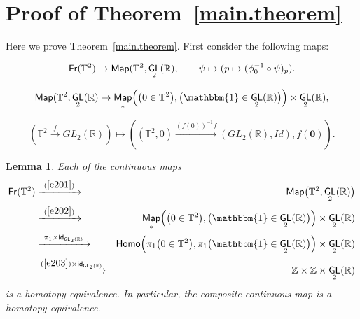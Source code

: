 \documentclass{amsart}
\newtheorem{lemma}[theorem]{Lemma}
\theoremstyle{definition}
\theoremstyle{remark}
\DeclareMathOperator{\Map}{{\sf Map}}
\newcommand{\xra}{\xrightarrow}
\DeclareMathOperator{\uno}{\mathbbm{1}}
\DeclareMathOperator{\GL}{\sf GL}
\DeclareMathOperator{\Fr}{\sf Fr}
\DeclareMathOperator{\id}{\sf id}
\begin{document}
\section{Proof of Theorem~\ref{main.theorem}}\label{s1}
Here we prove Theorem~\ref{main.theorem}. First consider the following maps:

\begin{equation}\label{e201}
\Fr(\mathbb{T}^{2}) \rightarrow \Map(\mathbb{T}^{2}, \GL_{2}(\mathbb{R}), \qquad \psi \mapsto (p \mapsto (\phi_{0}^{-1} \circ \psi)_{p}).
\end{equation}

\begin{equation}\label{e202}
\Map(\mathbb{T}^{2}, \GL_{2}(\mathbb{R}) \rightarrow \Map_\ast \Bigl( \bigl( 0 \in \TT^2 \bigr) , \bigl( \uno \in \GL_2(\RR) \bigr) \Bigr) \times \GL_2(\RR),
\end{equation}

$$(\mathbb{T}^{2} \xrightarrow{f} GL_{2}(\mathbb{R})) \mapsto ((\mathbb{T}^{2}, 0) \xrightarrow{(f(0))^{-1}f} (GL_{2}(\mathbb{R}), Id), f(\textbf{0})).$$ \newline



\begin{lemma}\label{t5}
Each of the continuous maps
\begin{eqnarray}\label{e21}
\Fr(\TT^2) 
&
\xra{~(\ref{e201})~}
&
\Map\bigl( \TT^2 , \GL_2(\RR) \bigr)
\\
\nonumber
&
\xra{~(\ref{e202})~}
&
\Map_\ast \Bigl( \bigl( 0 \in \TT^2 \bigr) , \bigl( \uno \in \GL_2(\RR) \bigr) \Bigr) \times \GL_2(\RR) 
\\
\nonumber
&
\xra{~\pi_1 \times \id_{\GL_2(\RR)}~}
&
{\sf Homo}\Bigl( \pi_1\bigl( 0 \in \TT^2 \bigr) , \pi_1\bigl( \uno \in \GL_2(\RR) \bigr) \Bigr) \times \GL_2(\RR) 
\\
\nonumber
&
\xra{(\ref{e203}) \times \id_{\GL_{2}(\RR)}}
&
\ZZ\times \ZZ \times \GL_2(\RR)
\end{eqnarray}
is a homotopy equivalence. 
In particular, the composite continuous map is a homotopy equivalence.  
\end{lemma}
\end{document}
